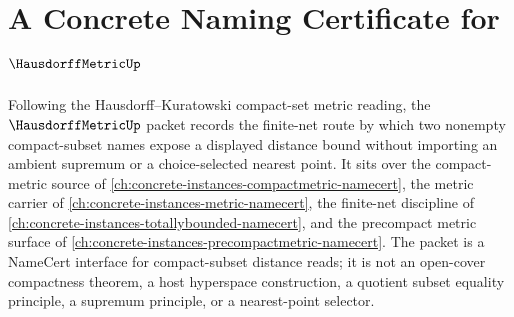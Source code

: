 \chapter{A Concrete Naming Certificate for $\HausdorffMetricUp$}
\label{ch:concrete-instances-hausdorff-metric-namecert}

Following the Hausdorff--Kuratowski compact-set metric reading, the $\HausdorffMetricUp$ packet records the finite-net route by which two nonempty compact-subset names expose a displayed distance bound without importing an ambient supremum or a choice-selected nearest point. It sits over the compact-metric source of \autoref{ch:concrete-instances-compactmetric-namecert}, the metric carrier of \autoref{ch:concrete-instances-metric-namecert}, the finite-net discipline of \autoref{ch:concrete-instances-totallybounded-namecert}, and the precompact metric surface of \autoref{ch:concrete-instances-precompactmetric-namecert}. The packet is a NameCert interface for compact-subset distance reads; it is not an open-cover compactness theorem, a host hyperspace construction, a quotient subset equality principle, a supremum principle, or a nearest-point selector.

